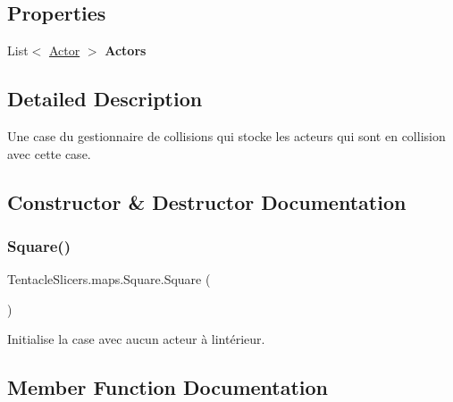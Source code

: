 \subsection*{Properties}
\begin{DoxyCompactItemize}
\item 
\mbox{\label{class_tentacle_slicers_1_1maps_1_1_square_aad47da5209e9623e59952046373f73c1}} 
List$<$ \hyperlink{class_tentacle_slicers_1_1actors_1_1_actor}{Actor} $>$ {\bfseries Actors}
\end{DoxyCompactItemize}


\subsection{Detailed Description}
Une case du gestionnaire de collisions qui stocke les acteurs qui sont en collision avec cette case. 



\subsection{Constructor \& Destructor Documentation}
\mbox{\label{class_tentacle_slicers_1_1maps_1_1_square_a9e71545a8dcf75175a3053725e1c3364}} 
\subsubsection{\texorpdfstring{Square()}{Square()}}
{\footnotesize\ttfamily Tentacle\+Slicers.\+maps.\+Square.\+Square (\begin{DoxyParamCaption}{ }\end{DoxyParamCaption})}



Initialise la case avec aucun acteur à l\textquotesingle{}intérieur. 



\subsection{Member Function Documentation}
\mbox{\label{class_tentacle_slicers_1_1maps_1_1_square_ad34913b602e2716f011f1b9810eb02ca}} 
